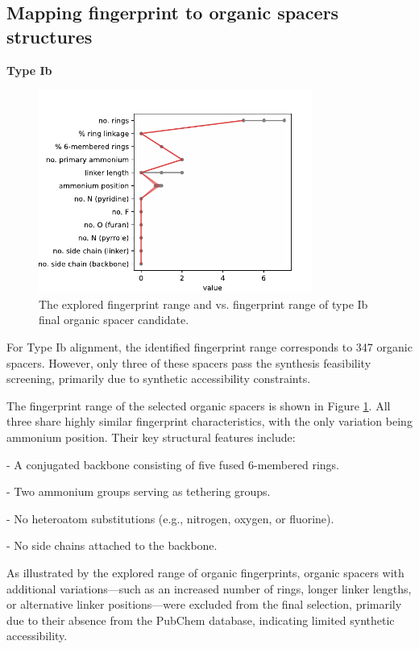 \subsection{Mapping fingerprint to organic spacers structures}
\textbf{Type Ib}

\begin{figure}[htbp]
    \centering
    \includegraphics[width=0.8\textwidth]{figures/synthesis-feasibility/figure5-14.pdf}
    \caption{The explored fingerprint range and vs. fingerprint range of type Ib final organic spacer candidate.}
    \label{fig:figure5.14}
\end{figure}

For Type Ib alignment, the identified fingerprint range corresponds to 347 organic spacers. However, only three of these spacers pass the synthesis feasibility screening, primarily due to synthetic accessibility constraints.

The fingerprint range of the selected organic spacers is shown in Figure \ref{fig:figure5.14}. All three share highly similar fingerprint characteristics, with the only variation being ammonium position. Their key structural features include:

-	A conjugated backbone consisting of five fused 6-membered rings.

-	Two ammonium groups serving as tethering groups.

-	No heteroatom substitutions (e.g., nitrogen, oxygen, or fluorine).

-	No side chains attached to the backbone.

As illustrated by the explored range of organic fingerprints, organic spacers with additional variations—such as an increased number of rings, longer linker lengths, or alternative linker positions—were excluded from the final selection, primarily due to their absence from the PubChem database, indicating limited synthetic accessibility.


